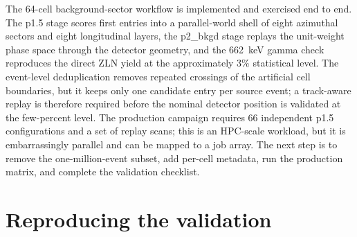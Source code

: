 \documentclass[11pt,a4paper]{article}
\begin{document}
The 64-cell background-sector workflow is implemented and exercised end to end.
The p1.5 stage scores first entries into a parallel-world shell of eight
azimuthal sectors and eight longitudinal layers, the p2\_bkgd stage replays the
unit-weight phase space through the detector geometry, and the \SI{662}{keV}
gamma check reproduces the direct ZLN yield at the approximately 3\% statistical
level. The event-level deduplication removes repeated crossings of the
artificial cell boundaries, but it keeps only one candidate entry per source
event; a track-aware replay is therefore required before the nominal detector
position is validated at the few-percent level. The production campaign requires 66
independent p1.5 configurations and a set of replay scans; this is an HPC-scale
workload, but it is embarrassingly parallel and can be mapped to a job array.
The next step is to remove the one-million-event subset, add per-cell metadata,
run the production matrix, and complete the validation checklist.

\appendix

\section{Reproducing the validation}
\end{document}
